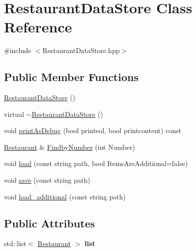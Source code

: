 \hypertarget{classRestaurantDataStore}{\section{Restaurant\-Data\-Store Class Reference}
\label{classRestaurantDataStore}
}


{\ttfamily \#include $<$Restaurant\-Data\-Store.\-hpp$>$}

\subsection*{Public Member Functions}
\begin{DoxyCompactItemize}
\item 
\hyperlink{classRestaurantDataStore_af8f86d29e3a76e964cc800ca6ad558fc}{Restaurant\-Data\-Store} ()
\item 
virtual \hyperlink{classRestaurantDataStore_ad40b37de8908fab03e7b224ae8f90f28}{$\sim$\-Restaurant\-Data\-Store} ()
\item 
void \hyperlink{classRestaurantDataStore_ad93c185aa70e70775844d4e21402ec4d}{print\-As\-Debug} (bool printeol, bool printcontent) const 
\item 
\hyperlink{classRestaurant}{Restaurant} \& \hyperlink{classRestaurantDataStore_a23cc1d33c1f53a477a6fadc8e8894757}{Findby\-Number} (int Number)
\item 
void \hyperlink{classRestaurantDataStore_a110407e1b764b7eba249093358730aee}{load} (const string path, bool Items\-Are\-Additional=false)
\item 
void \hyperlink{classRestaurantDataStore_af0a228a38c8a77ff4d03413e36e7813b}{save} (const string path)
\item 
void \hyperlink{classRestaurantDataStore_abdd5fbf8695de1f8ec4de4238d0705a3}{load\-\_\-additional} (const string path)
\end{DoxyCompactItemize}
\subsection*{Public Attributes}
\begin{DoxyCompactItemize}
\item 
\hypertarget{classRestaurantDataStore_a37965da233518c654c93108824fb64b8}{std\-::list$<$ \hyperlink{classRestaurant}{Restaurant} $>$ {\bfseries list}}\label{classRestaurantDataStore_a37965da233518c654c93108824fb64b8}

\end{DoxyCompactItemize}


